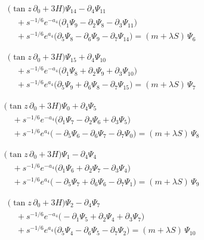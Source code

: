 \documentclass[11pt]{article}
\begin{document}
\[
\begin{aligned}
&\bigl(\tan z\,\partial_{0}+3H\bigr)\Psi_{14}-\partial_{4}\Psi_{11} \\
&\quad +s^{-1/6}e^{-a_4}\bigl(\partial_{1}\Psi_{9}-\partial_{2}\Psi_{8}-\partial_{3}\Psi_{11}\bigr) \\
&\quad +s^{-1/6}e^{a_4}\bigl(\partial_{5}\Psi_{8}-\partial_{6}\Psi_{9}-\partial_{7}\Psi_{14}\bigr)=(m+\lambda S)\,\Psi_{6}
\end{aligned}\tag{E6}
\]

\[
\begin{aligned}
&\bigl(\tan z\,\partial_{0}+3H\bigr)\Psi_{15}+\partial_{4}\Psi_{10} \\
&\quad +s^{-1/6}e^{-a_4}\bigl(\partial_{1}\Psi_{8}+\partial_{2}\Psi_{9}+\partial_{3}\Psi_{10}\bigr) \\
&\quad +s^{-1/6}e^{a_4}\bigl(\partial_{5}\Psi_{9}+\partial_{6}\Psi_{8}-\partial_{7}\Psi_{15}\bigr)=(m+\lambda S)\,\Psi_{7}
\end{aligned}\tag{E7}
\]

\[
\begin{aligned}
&\bigl(\tan z\,\partial_{0}+3H\bigr)\Psi_{0}+\partial_{4}\Psi_{5} \\
&\quad +s^{-1/6}e^{-a_4}\bigl(\partial_{1}\Psi_{7}-\partial_{2}\Psi_{6}+\partial_{3}\Psi_{5}\bigr) \\
&\quad +s^{-1/6}e^{a_4}\bigl(-\partial_{5}\Psi_{6}-\partial_{6}\Psi_{7}-\partial_{7}\Psi_{0}\bigr)=(m+\lambda S)\,\Psi_{8}
\end{aligned}\tag{E8}
\]

\[
\begin{aligned}
&\bigl(\tan z\,\partial_{0}+3H\bigr)\Psi_{1}-\partial_{4}\Psi_{4} \\
&\quad +s^{-1/6}e^{-a_4}\bigl(\partial_{1}\Psi_{6}+\partial_{2}\Psi_{7}-\partial_{3}\Psi_{4}\bigr) \\
&\quad +s^{-1/6}e^{a_4}\bigl(-\partial_{5}\Psi_{7}+\partial_{6}\Psi_{6}-\partial_{7}\Psi_{1}\bigr)=(m+\lambda S)\,\Psi_{9}
\end{aligned}\tag{E9}
\]

\[
\begin{aligned}
&\bigl(\tan z\,\partial_{0}+3H\bigr)\Psi_{2}-\partial_{4}\Psi_{7} \\
&\quad +s^{-1/6}e^{-a_4}\bigl(-\partial_{1}\Psi_{5}+\partial_{2}\Psi_{4}+\partial_{3}\Psi_{7}\bigr) \\
&\quad +s^{-1/6}e^{a_4}\bigl(\partial_{5}\Psi_{4}-\partial_{6}\Psi_{5}-\partial_{7}\Psi_{2}\bigr)=(m+\lambda S)\,\Psi_{10}
\end{aligned}\tag{E10}
\]
\end{document}
